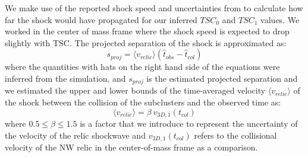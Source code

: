 We make use of the reported shock speed and uncertainties from \cite{L13}
to calculate how far the shock would have propagated for our inferred
$TSC_0$ and $TSC_1$ values. We worked in the center of mass frame where the
shock speed is expected to drop slightly with TSC. 
The projected separation of the shock is approximated as:
\begin{equation}
	s_{proj} = \langle v_{relic} \rangle (\hat{t}_{obs} - \hat{t}_{col})
	\label{eqn: projectedsep}
\end{equation}
where the quantities with hats on the right hand side of the equations were
inferred from the simulation, and $s_{proj}$ is the estimated projected separation and we estimated the
upper and lower bounds of the time-averaged velocity
$\langle v_{relic} \rangle$ of the shock between
the collision of the subclusters and the observed time as:  
\begin{equation}
	\langle v_{relic} \rangle = \beta~v_{3D,1}(t_{col})  
\end{equation}
where $0.5 \leq \beta \leq 1.5$ is a factor that we introduce to represent the
uncertainty of the velocity of the relic shockwave and $v_{3D,1}(t_{col})$ refers to the collisional velocity of
the NW relic in the center-of-mass frame as a comparison. 


\par      

